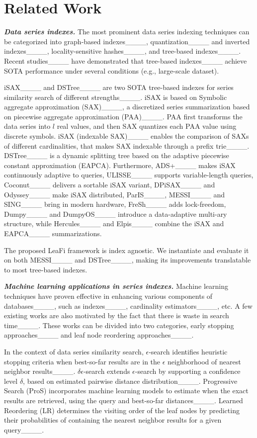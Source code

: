 \section{Related Work}
\label{sec-related-work}

\noindent \textbf{\textit{Data series indexes.}}
\label{sec-lit-index}
The most prominent data series indexing techniques can be categorized into graph-based indexes____, 
quantization____ and inverted indexes____, 
locality-sensitive hashes____,
and tree-based indexes____. 
Recent studies____ have demonstrated that tree-based indexes____ achieve SOTA performance under several conditions (e.g., large-scale dataset).

iSAX____ and DSTree____ are two SOTA tree-based indexes for series similarity search of different strengths____.
iSAX is based on Symbolic aggregate approximation (SAX)____, a discretized series summarization based on piecewise aggregate approximation (PAA)____.
PAA first transforms the data series into $l$ real values, and then SAX quantizes each PAA value using discrete symbols. 
iSAX (indexable SAX)____ enables the comparison of SAXs of different cardinalities, that makes SAX indexable through a prefix trie____. 
DSTree____ is a dynamic splitting tree based on the adaptive piecewise constant approximation (EAPCA).
Furthermore, 
ADS+____ makes iSAX continuously adaptive to queries, 
ULISSE____ supports variable-length queries, 
Coconut____ delivers a sortable iSAX variant, 
DPiSAX____ and Odyssey____ make iSAX distributed, 
ParIS____, MESSI____ and SING____ bring in modern hardware, FreSh____ adds lock-freedom, 
Dumpy____ and DumpyOS____ introduce a data-adaptive multi-ary structure, 
while Hercules____ and Elpis____ combine the iSAX and EAPCA____ summarizations.

The proposed LeaFi framework is index agnostic.
We instantiate and evaluate it on both MESSI____ and DSTree____, making its improvements translatable to most tree-based indexes.

\noindent \textbf{\textit{Machine learning applications in series indexes.}}
\label{sec-lit-learned-index}
Machine learning techniques have proven effective in enhancing various components of databases____, such as indexes____, cardinality estimators____, etc.
A few existing works are also motivated by the fact that there is waste in search time____. 
These works can be divided into two categories, early stopping approaches____ and leaf node reordering approaches____.

In the context of data series similarity search, $\epsilon$-search identifies heuristic stopping criteria when best-so-far results are in the $\epsilon$ neighborhood of nearest neighbor results____.
$\delta\epsilon$-search extends $\epsilon$-search by supporting a confidence level $\delta$, based on estimated pairwise distance distribution____.
Progressive Search (ProS) incorporates machine learning models to estimate when the exact results are retrieved, using the query and best-so-far distances____.
Learned Reordering (LR) determines the visiting order of the leaf nodes by predicting their probabilities of containing the nearest neighbor results for a given query____.

